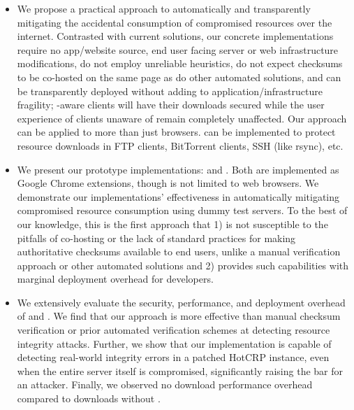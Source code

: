 \begin{itemize}

  \item We propose a practical approach to automatically and transparently
  mitigating the accidental consumption of compromised resources over the
  internet. Contrasted with current solutions, our concrete implementations
  require no app/website source, end user facing server or web infrastructure
  modifications, do not employ unreliable heuristics, do not expect checksums to
  be co-hosted on the same page as do other automated solutions, and can be
  transparently deployed without adding to application/infrastructure fragility;
  \eg \SYSTEM{}-aware clients will have their downloads secured while the user
  experience of clients unaware of \SYSTEM{} remain completely unaffected. Our
  approach can be applied to more than just browsers. \SYSTEM{} can be
  implemented to protect resource downloads in FTP clients, BitTorrent clients,
  SSH (like rsync), etc.

  \item We present our prototype \SYSTEM{} implementations: \DNSSYS{} and
  \DHTSYS{}. Both are implemented as Google Chrome extensions, though \SYSTEM{}
  is not limited to web browsers. We demonstrate our implementations'
  effectiveness in automatically mitigating compromised resource consumption
  using dummy test servers. To the best of our knowledge, this is the first
  approach that 1) is not susceptible to the pitfalls of co-hosting or the lack
  of standard practices for making authoritative checksums available to end
  users, unlike a manual verification approach or other automated solutions and
  2) provides such capabilities with marginal deployment overhead for
  developers.

  \item We extensively evaluate the security, performance, and deployment
  overhead of \DNSSYS{} and \DHTSYS{}. We find that our approach is more
  effective than manual checksum verification or prior automated verification
  schemes at detecting resource integrity attacks. Further, we show that our
  \DNSSYS{} implementation is capable of detecting real-world integrity errors
  in a patched HotCRP instance, even when the entire server itself is
  compromised, significantly raising the bar for an attacker. Finally, we
  observed no download performance overhead compared to downloads without
  \DNSSYS{}.

\end{itemize}
